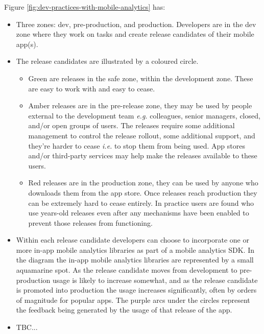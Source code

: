 Figure \ref{fig:dev-practices-with-mobile-analytics} has:
\begin{itemize}
\item Three zones: dev, pre-production, and production. Developers are in the dev zone where they work on tasks and create release candidates of their mobile app(s). 
\item The release candidates are illustrated by a coloured circle. 
    \begin{itemize}
    \item Green are releases in the safe zone, within the development zone. These are easy to work with and easy to cease.
    \item Amber releases are in the pre-release zone, they may be used by people external to the development team \textit{e.g.} colleagues, senior managers, closed, and/or open groups of users. The releases require some additional management to control the release rollout, some additional support, and they're harder to cease \textit{i.e.} to stop them from being used. App stores and/or third-party services may help make the releases available to these users.
    \item Red releases are in the production zone, they can be used by anyone who downloads them from the app store. Once releases reach production they can be extremely hard to cease entirely. In practice users are found who use years-old releases even after any mechanisms have been enabled to prevent those releases from functioning. 
    \end{itemize}
\item Within each release candidate developers can choose to incorporate one or more in-app mobile analytics libraries as part of a mobile analytics SDK. In the diagram the in-app mobile analytics libraries are represented by a small aquamarine spot. As the release candidate moves from development to pre-production usage is likely to increase somewhat, and as the release candidate is promoted into production the usage increases significantly, often by orders of magnitude for popular apps. The purple arcs under the circles represent the feedback being generated by the usage of that release of the app.
\item TBC...
\end{itemize}


